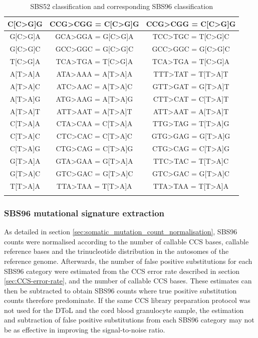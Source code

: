 \begin{longtable}{c|c|c}
\ttfamily C[C>G]G & \ttfamily CCG>CGG = C[C>G]G & \ttfamily CCG>CGG = C[C>G]G \\ \hline
\ttfamily G[C>G]A & \ttfamily GCA>GGA = G[C>G]A & \ttfamily TCC>TGC = T[C>G]C \\ \hline
\ttfamily G[C>G]C & \ttfamily GCC>GGC = G[C>G]C & \ttfamily GCC>GGC = G[C>G]C \\ \hline
\ttfamily T[C>G]A & \ttfamily TCA>TGA = T[C>G]A & \ttfamily TCA>TGA = T[C>G]A \\ \hline
\ttfamily A[T>A]A & \ttfamily ATA>AAA = A[T>A]A & \ttfamily TTT>TAT = T[T>A]T \\ \hline
\ttfamily A[T>A]C & \ttfamily ATC>AAC = A[T>A]C & \ttfamily GTT>GAT = G[T>A]T \\ \hline
\ttfamily A[T>A]G & \ttfamily ATG>AAG = A[T>A]G & \ttfamily CTT>CAT = C[T>A]T \\ \hline
\ttfamily A[T>A]T & \ttfamily ATT>AAT = A[T>A]T & \ttfamily ATT>AAT = A[T>A]T \\ \hline
\ttfamily C[T>A]A & \ttfamily CTA>CAA = C[T>A]A & \ttfamily TTG>TAG = T[T>A]G \\ \hline
\ttfamily C[T>A]C & \ttfamily CTC>CAC = C[T>A]C & \ttfamily GTG>GAG = G[T>A]G \\ \hline
\ttfamily C[T>A]G & \ttfamily CTG>CAG = C[T>A]G & \ttfamily CTG>CAG = C[T>A]G \\ \hline
\ttfamily G[T>A]A & \ttfamily GTA>GAA = G[T>A]A & \ttfamily TTC>TAC = T[T>A]C \\ \hline
\ttfamily G[T>A]C & \ttfamily GTC>GAC = G[T>A]C & \ttfamily GTC>GAC = G[T>A]C \\ \hline
\ttfamily T[T>A]A & \ttfamily TTA>TAA = T[T>A]A & \ttfamily TTA>TAA = T[T>A]A \\ \hline
\caption{SBS52 classification and corresponding SBS96 classification}
\end{longtable}
\endgroup

\subsubsection{SBS96 mutational signature extraction}

As detailed in section \ref{sec:somatic_mutation_count_normalisation}, SBS96 counts were normalised according to the number of callable CCS bases, callable reference bases and the trinucleotide distribution in the autosomes of the reference genome. Afterwards, the number of false positive substitutions for each SBS96 category were estimated from the CCS error rate described in section \ref{sec:CCS-error-rate}, and the number of callable CCS bases. These estimates can then be subtracted to obtain SBS96 counts where true positive substitution counts therefore predominate. If the same CCS library preparation protocol was not used for the DToL and the cord blood granulocyte sample, the estimation and subtraction of false positive substitutions from each SBS96 category may not be as effective in improving the signal-to-noise ratio. 

